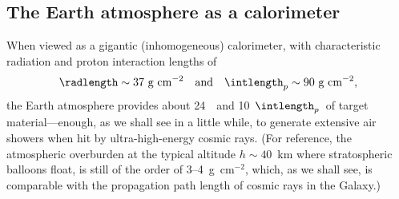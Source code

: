 \subsection{The Earth atmosphere as a calorimeter}
\label{sec:atmosphere_calorimeter}

\begin{marginfigure}
  
  \caption{Longitudinal profile of the Earth atmosphere, when viewed as a
  calorimeter (from the top). The two leftmost axes represent the total grammage
  above any given altitude expressed in radiation lengths and proton
  interaction lengths, calculated inverting~\eqref{eq:atmospheric_grammage}.}
  \label{fig:atmospheric_scales}
\end{marginfigure}

When viewed as a gigantic (inhomogeneous) calorimeter, with characteristic
radiation and proton interaction lengths of
\begin{align*}
  \radlength \sim 37~\text{g~cm}^{-2}
  \quad\text{and}\quad
  \intlength_p \sim 90~\text{g~cm}^{-2},
\end{align*}
the Earth atmosphere provides about 24~\radlength~and 10~$\intlength_p$~of target
material---enough, as we shall see in a little while, to generate extensive air
showers when hit by ultra-high-energy cosmic rays.
(For reference, the atmospheric overburden at the typical altitude $h \sim 40$~km
where stratospheric balloons float, is still of the order of 3--4~g~cm$^{-2}$, which,
as we shall see, is comparable with the propagation path length of cosmic rays in
the Galaxy.)


\begin{marginfigure}
  
  \caption{\cherenkov~energy threshold for electrons and maximum \cherenkov~angle
  as a function of the altitude.}
  \label{fig:atmospheric_cherenkov}
\end{marginfigure}

